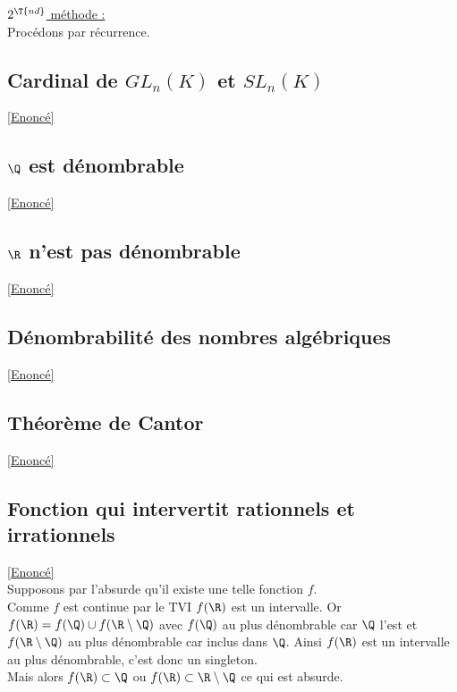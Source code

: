 \documentclass[8pt]{book}
\begin{document}
	\underline{$2^{\T{nd}}$ méthode :}\\
	Procédons par récurrence.
	
	\subsection{Cardinal de $GL_n(K)$ et $SL_n(K)$}
	\textcolor{blue}{\hyperref[Cardinal de GL_n et SL_n]{[Enoncé]}}\\
	\label{Cardinal de Gl_n et Sl_n corrigé}
	
	\subsection{$\Q$ est dénombrable}
	\label{Q est dénombrable corrigé}
	\textcolor{blue}{\hyperref[Q est dénombrable]{[Enoncé]}}\\
	
	\subsection{$\R$ n'est pas dénombrable}
	\textcolor{blue}{\hyperref[R n'est pas dénombrable]{[Enoncé]}}\\
	\label{R n'est pas dénombrable corrigé}
	
	\subsection{Dénombrabilité des nombres algébriques}
	\textcolor{blue}{\hyperref[Dénombrabilité des nombres algébriques]{[Enoncé]}}\\
	\label{Dénombrabilité des nombres algébriques corrigé}
	
	\subsection{Théorème de Cantor}
	\textcolor{blue}{\hyperref[Théorème de Cantor]{[Enoncé]}}\\
	\label{Théorème de Cantor corrigé}
	
	\subsection{Fonction qui intervertit rationnels et irrationnels }
	\textcolor{blue}{\hyperref[Fonction qui intervertit rationnels et irrationnels]{[Enoncé]}}\\
	\label{Fonction qui intervertit rationnels et irrationnels corrigé}
	Supposons par l'absurde qu'il existe une telle fonction $f$.\\
	Comme $f$ est continue par le TVI $f(\R)$ est un intervalle. Or $f(\R)=f(\Q)\cup f(\R\setminus\Q)$ avec $f(\Q)$ au plus dénombrable car $\Q$ l'est et $f(\R\setminus\Q)$ au plus dénombrable car inclus dans $\Q$. Ainsi $f(\R)$ est un intervalle au plus dénombrable, c'est donc un singleton.\\
	Mais alors $f(\R)\subset \Q$ ou $f(\R)\subset \R\setminus\Q$ ce qui est absurde.
	
\end{document}
